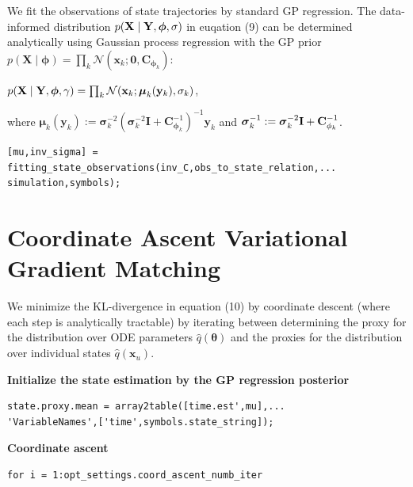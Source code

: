 \begin{par}
We fit the observations of state trajectories by standard GP regression. The data-informed distribution $p(\mathbf{X} \mid \mathbf{Y}, \boldsymbol{\phi},\mathbf\mathbf{\sigma})$ in euqation (9) can be determined analytically using Gaussian process regression with the GP prior $p(\mathbf{X} \mid\mathbf{\phi}) = \prod_k \mathcal{N}(\mathbf{x}_k ;\mathbf{0},\mathbf{C}_{\boldsymbol{\phi}_k})$:
\end{par} \vspace{1em}
\begin{par}
$p(\mathbf{X} \mid \mathbf{Y}, \boldsymbol{\phi},\gamma) = \prod_k\mathcal{N}(\mathbf{x}_k ;\boldsymbol\mu_k(\mathbf{y}_k),\mathbf\mathbf{\sigma}_k)$,
\end{par} \vspace{1em}
\begin{par}
where $\boldsymbol\mu_k(\mathbf{y}_k) := \boldsymbol{\sigma}_k^{-2} \left(\boldsymbol{\sigma}_k^{-2}\mathbf{I} + \mathbf{C}_{\boldsymbol{\phi}_k}^{-1} \right)^{-1} \mathbf{y}_k$ and $\boldsymbol{\sigma}_k ^{-1}:=\boldsymbol{\sigma}_k^{-2} \mathbf{I} +\mathbf{C}_{\mathbf\mathbf{\phi}_k}^{-1}$.
\end{par} 
\color{RoyalPurple}\begin{verbatim}
[mu,inv_sigma] = fitting_state_observations(inv_C,obs_to_state_relation,...
simulation,symbols);
\end{verbatim} 
\color{black}


\section{Coordinate Ascent Variational Gradient Matching}

\begin{par}
We minimize the KL-divergence in equation (10) by coordinate descent (where each step is analytically tractable) by iterating between determining the proxy for the distribution over ODE parameters $\hat{q}(\boldsymbol{\theta})$ and the proxies for the distribution over individual states $\hat{q}(\mathbf{x}_u)$.
\end{par} \vspace{1.5em}

\textbf{Initialize the state estimation by the GP regression posterior}
\color{RoyalPurple}\begin{verbatim}
state.proxy.mean = array2table([time.est',mu],...
'VariableNames',['time',symbols.state_string]);
\end{verbatim} 
\color{black}
\vspace{1.5em}
\textbf{Coordinate ascent}
\color{RoyalPurple}\begin{verbatim}
for i = 1:opt_settings.coord_ascent_numb_iter
\end{verbatim} 
\color{black}

